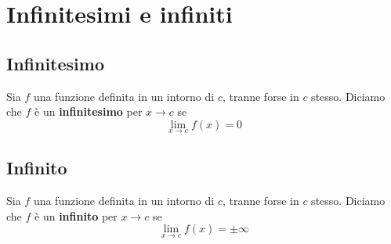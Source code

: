 \documentclass{book}
\begin{document}
\section{Infinitesimi e infiniti}

\begin{definition}
    \subsection{Infinitesimo}
    Sia \(f\) una funzione definita in un intorno di \(c\), tranne forse in \(c\) stesso. Diciamo che \(f\) è un \textbf{infinitesimo} per \(x \to c\) se
    \[
        \lim_{x \to c} f(x) = 0
    \]
\end{definition}
\begin{definition}
    \subsection{Infinito}
    Sia \(f\) una funzione definita in un intorno di \(c\), tranne forse in \(c\) stesso. Diciamo che \(f\) è un \textbf{infinito} per \(x \to c\) se
    \[
        \lim_{x \to c} f(x) = \pm \infty
    \]
\end{definition}
\end{document}
